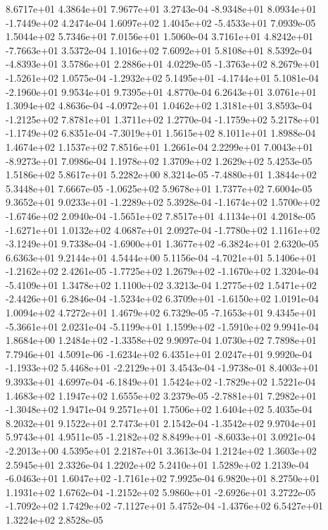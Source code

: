 8.6717e+01 4.3864e+01 7.9677e+01  3.2743e-04
-8.9348e+01  8.0934e+01 -1.7449e+02  4.2474e-04
 1.6097e+02  1.4045e+02 -5.4533e+01  7.0939e-05
1.5044e+02 5.7346e+01 7.0156e+01  1.5060e-04
 3.7161e+01  4.8242e+01 -7.7663e+01  3.5372e-04
1.1016e+02 7.6092e+01 5.8108e+01  8.5392e-04
-4.8393e+01  3.5786e+01  2.2886e+01  4.0229e-05
-1.3763e+02  8.2679e+01 -1.5261e+02  1.0575e-04
-1.2932e+02  5.1495e+01 -4.1744e+01  5.1081e-04
-2.1960e+01  9.9534e+01  9.7395e+01  4.8770e-04
6.2643e+01 3.0761e+01 1.3094e+02  4.8636e-04
-4.0972e+01  1.0462e+02  1.3181e+01  3.8593e-04
-1.2125e+02  7.8781e+01  1.3711e+02  1.2770e-04
-1.1759e+02  5.2178e+01 -1.1749e+02  6.8351e-04
-7.3019e+01  1.5615e+02  8.1011e+01  1.8988e-04
1.4674e+02 1.1537e+02 7.8516e+01  1.2661e-04
 2.2299e+01  7.0043e+01 -8.9273e+01  7.0986e-04
1.1978e+02 1.3709e+02 1.2629e+02  5.4253e-05
1.5186e+02 5.8617e+01 5.2282e+00  8.3214e-05
-7.4880e+01  1.3844e+02  5.3448e+01  7.6667e-05
-1.0625e+02  5.9678e+01  1.7377e+02  7.6004e-05
 9.3652e+01  9.0233e+01 -1.2289e+02  5.3928e-04
-1.1674e+02  1.5700e+02 -1.6746e+02  2.0940e-04
-1.5651e+02  7.8517e+01  4.1134e+01  4.2018e-05
-1.6271e+01  1.0132e+02  4.0687e+01  2.0927e-04
-1.7780e+02  1.1161e+02 -3.1249e+01  9.7338e-04
-1.6900e+01  1.3677e+02 -6.3824e+01  2.6320e-05
6.6363e+01 9.2144e+01 4.5444e+00  5.1156e-04
-4.7021e+01  5.1406e+01 -1.2162e+02  2.4261e-05
-1.7725e+02  1.2679e+02 -1.1670e+02  1.3204e-04
-5.4109e+01  1.3478e+02  1.1100e+02  3.3213e-04
 1.2775e+02  1.5471e+02 -2.4426e+01  6.2846e-04
-1.5234e+02  6.3709e+01 -1.6150e+02  1.0191e-04
1.0094e+02 4.7272e+01 1.4679e+02  6.7329e-05
-7.1653e+01  9.4345e+01 -5.3661e+01  2.0231e-04
-5.1199e+01  1.1599e+02 -1.5910e+02  9.9941e-04
 1.8684e+00  1.2484e+02 -1.3358e+02  9.9097e-04
1.0730e+02 7.7898e+01 7.7946e+01  4.5091e-06
-1.6234e+02  6.4351e+01  2.0247e+01  9.9920e-04
-1.1933e+02  5.4468e+01 -2.2129e+01  3.4543e-04
-1.9738e-01  8.4003e+01  9.3933e+01  4.6997e-04
-6.1849e+01  1.5424e+02 -1.7829e+02  1.5221e-04
1.4683e+02 1.1947e+02 1.6555e+02  3.2379e-05
-2.7881e+01  7.2982e+01 -1.3048e+02  1.9471e-04
9.2571e+01 1.7506e+02 1.6404e+02  5.4035e-04
8.2032e+01 9.1522e+01 2.7473e+01  2.1542e-04
-1.3542e+02  9.9704e+01  5.9743e+01  4.9511e-05
-1.2182e+02  8.8499e+01 -8.6033e+01  3.0921e-04
-2.2013e+00  4.5395e+01  2.2187e+01  3.3613e-04
1.2124e+02 1.3603e+02 2.5945e+01  2.3326e-04
1.2202e+02 5.2410e+01 1.5289e+02  1.2139e-04
-6.0463e+01  1.6047e+02 -1.7161e+02  7.9925e-04
6.9820e+01 8.2750e+01 1.1931e+02  1.6762e-04
-1.2152e+02  5.9860e+01 -2.6926e+01  3.2722e-05
-1.7092e+02  1.7429e+02 -7.1127e+01  5.4752e-04
-1.4376e+02  6.5427e+01  1.3224e+02  2.8528e-05
